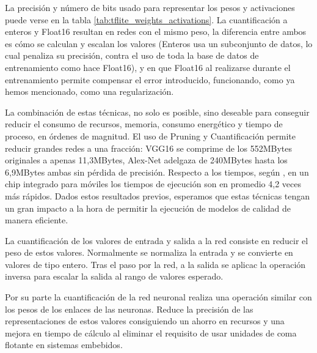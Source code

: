 La precisión y número de bits usado para representar los pesos y activaciones puede verse en la tabla \ref{tab:tflite_weights_activations}. La cuantificación a enteros y Float16 resultan en redes con el mismo peso, la diferencia entre ambos es cómo se calculan y escalan los valores (Enteros usa un subconjunto de datos, lo cual penaliza su precisión, contra el uso de toda la base de datos de entrenamiento como hace Float16), y en que Float16 al realizarse durante el entrenamiento permite compensar el error introducido, funcionando, como ya hemos mencionado, como una regularización.


  La combinación de estas técnicas, no solo es posible, sino deseable para conseguir reducir el consumo de recursos, memoria, consumo energético y tiempo de proceso, en órdenes de magnitud. El uso de Pruning y Cuantificación permite reducir grandes redes a una fracción: VGG16 se comprime de los 552MBytes originales a apenas 11,3MBytes, Alex-Net adelgaza de 240MBytes hasta los 6,9MBytes ambas sin pérdida de precisión\cite{Han2015}. Respecto a los tiempos, según \citeauthor{Han2015}, en un chip integrado para móviles los tiempos de ejecución son en promedio 4,2 veces más rápidos. Dados estos resultados previos, esperamos que estas técnicas tengan un gran impacto a la hora de permitir la ejecución de modelos de calidad de manera eficiente.














La cuantificación de los valores de entrada y salida a la red consiste en reducir el peso de estos valores. Normalmente se normaliza la entrada y se convierte en valores de tipo entero. Tras el paso por la red, a la salida se aplicac la operación inversa para escalar la salida al rango de valores esperado.

Por su parte la cuantificación de la red neuronal realiza una operación similar con los pesos de los enlaces de las neuronas. Reduce la precisión de las representaciones de estos valores consiguiendo un ahorro en recursos y una mejora en tiempo de cálculo al eliminar el requisito de usar unidades de coma flotante en sistemas embebidos.




% 


